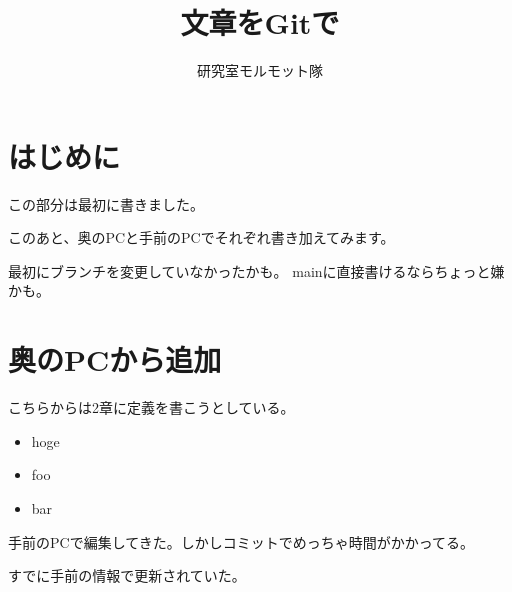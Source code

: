 \documentclass[a4j]{ujarticle}
\title{文章をGitで}
\author{研究室モルモット隊}
\begin{document}
\maketitle
\tableofcontents

\section{はじめに}
この部分は最初に書きました。

このあと、奥のPCと手前のPCでそれぞれ書き加えてみます。

最初にブランチを変更していなかったかも。
mainに直接書けるならちょっと嫌かも。

\section{奥のPCから追加}
こちらからは2章に定義を書こうとしている。
\begin{itemize}
    \item hoge
    \item foo
    \item bar
\end{itemize}
手前のPCで編集してきた。しかしコミットでめっちゃ時間がかかってる。

すでに手前の情報で更新されていた。
\end{document}

